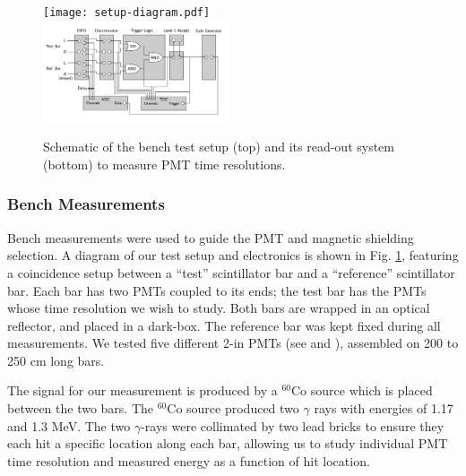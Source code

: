 \documentclass[3p,final,twocolumn]{elsarticle}
\begin{document}
\begin{figure}[th!]
	\centering
		\texttt{[image: setup-diagram.pdf]} \\
		\includegraphics[width=0.48\textwidth]{electr_setup.png}
	\caption{Schematic of the bench test setup (top) and its
          read-out system (bottom) to measure PMT time resolutions. }
	\label{fig:test_stand_setup}
\end{figure}

\subsubsection{Bench Measurements}
Bench measurements were used to guide the PMT and magnetic shielding
selection.  A diagram of our test setup and electronics is shown in
Fig. \ref{fig:test_stand_setup}, featuring a coincidence setup between
a ``test'' scintillator bar and a ``reference'' scintillator bar.  Each
bar has two PMTs coupled to its ends; the test bar has the PMTs whose
time resolution we wish to study.  Both bars are wrapped in an optical
reflector, and placed in a dark-box.  The reference bar was kept fixed
during all measurements.  We tested five different 2-in PMTs (see
\cite{hamapmts} and \cite{pmt9214}), assembled on 200 to 250
\si{\centi\meter} long bars.

The signal for our measurement is produced by a $^{60}$Co source which
is placed between the two bars.  The $^{60}$Co source produced two
$\gamma$ rays with energies of 1.17 and 1.3 \si{\mega\electronvolt}.
The two $\gamma$-rays were collimated by two lead bricks to ensure
they each hit a specific location along each bar, allowing us to study individual
PMT time resolution and measured energy as a function of hit location.
\end{document}
